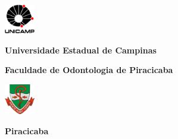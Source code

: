 \thispagestyle{plain}
\noindent%
\includegraphics[width=0.10\textwidth]{imagens/logo-unicamp}%
\begin{minipage}[b]{0.7\textwidth}
	\centering
	\textbf{Universidade Estadual de Campinas} \\
\vspace{0.5cm}

\textbf{Faculdade de Odontologia de Piracicaba}
\end{minipage}%
\includegraphics[width=0.10\textwidth]{imagens/logo-fop}

\vspace{4cm}
\begin{center}
	{\Large\textsc{\autor}}
\end{center}
\vspace{4cm}
\begin{center}
	{\Large\textbf{\textsc{\titulo}}}
\end{center}
\vfill
\begin{center}
	\textbf{Piracicaba \\ \ano}
\end{center}

